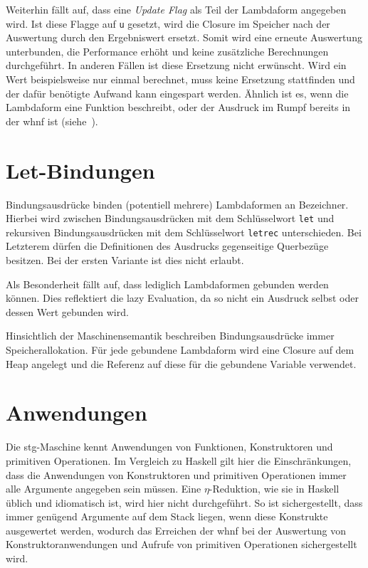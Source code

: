 Weiterhin fällt auf, dass eine \textit{Update Flag} als Teil der Lambdaform angegeben wird.
Ist diese Flagge auf \texttt{u} gesetzt, wird die Closure im Speicher nach der Auswertung durch den Ergebniswert ersetzt.
Somit wird eine erneute Auswertung unterbunden, die Performance erhöht und keine zusätzliche Berechnungen durchgeführt.
In anderen Fällen ist diese Ersetzung nicht erwünscht.
Wird ein Wert beispielsweise nur einmal berechnet, muss keine Ersetzung stattfinden und der dafür benötigte Aufwand kann eingespart werden.
Ähnlich ist es, wenn die Lambdaform eine Funktion beschreibt, oder der Ausdruck im Rumpf bereits in der \gls{whnf} ist (siehe~\cite[Chap. 4.2]{Jones_StockHardwareSTG}).


\section{Let-Bindungen}

Bindungsausdrücke binden (potentiell mehrere) Lambdaformen an Bezeichner.
Hierbei wird zwischen Bindungsausdrücken mit dem Schlüsselwort \texttt{let} und rekursiven Bindungsausdrücken mit dem Schlüsselwort \texttt{letrec} unterschieden.
Bei Letzterem dürfen die Definitionen des Ausdrucks gegenseitige Querbezüge besitzen.
Bei der ersten Variante ist dies nicht erlaubt.

Als Besonderheit fällt auf, dass lediglich Lambdaformen gebunden werden können.
Dies reflektiert die lazy Evaluation, da so nicht ein Ausdruck selbst oder dessen Wert gebunden wird.

Hinsichtlich der Maschinensemantik beschreiben Bindungsausdrücke immer Speicherallokation.
Für jede gebundene Lambdaform wird eine Closure auf dem Heap angelegt und die Referenz auf diese für die gebundene Variable verwendet.


\section{Anwendungen}

Die \gls{stg}-Maschine kennt Anwendungen von Funktionen, Konstruktoren und primitiven Operationen.
Im Vergleich zu Haskell gilt hier die Einschränkungen, dass die Anwendungen von Konstruktoren und primitiven Operationen immer alle Argumente angegeben sein müssen.
Eine $\eta$-Reduktion, wie sie in Haskell üblich und idiomatisch ist, wird hier nicht durchgeführt.
So ist sichergestellt, dass immer genügend Argumente auf dem Stack liegen, wenn diese Konstrukte ausgewertet werden, wodurch das Erreichen der \gls{whnf} bei der Auswertung von Konstruktoranwendungen und Aufrufe von primitiven Operationen sichergestellt wird.


